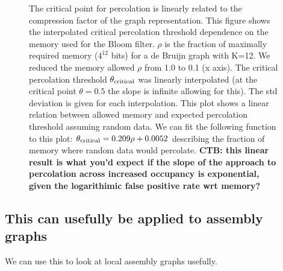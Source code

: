 \documentclass[12pt]{article} \usepackage{simplemargins}
\begin{document}
\begin{figure}
\caption{The critical point for percolation is linearly related to the
  compression factor of the graph representation.
This figure shows
  the interpolated critical percolation threshold dependence on the
  memory used for the Bloom filter. $\rho$ is the fraction of
  maximally required memory ($4^{12}$ bits) for a de Bruijn graph with
  K=12. We reduced the memory allowed $\rho$ from 1.0 to 0.1 (x
  axis). The critical percolation threshold $\theta_{\rm critical}$
  was linearly interpolated (at the critical point $\theta=0.5$ the
  slope is infinite allowing for this). The std deviation is given for
  each interpolation. This plot shows a linear relation between
  allowed memory and expected percolation threshold assuming random
  data. We can fit the following function to this plot: $\theta_{\rm
    critical} = 0.209 \rho + 0.0052$ describing the fraction of memory
  where random data would percolate.  {\bf CTB: this linear result is
    what you'd expect if the slope of the approach to percolation
    across increased occupancy is exponential, given the logarithimic
    false positive rate wrt memory?}}

\end{figure}

\subsection{This can usefully be applied to assembly graphs}

We can use this to look at local assembly graphs usefully.
\end{document}
